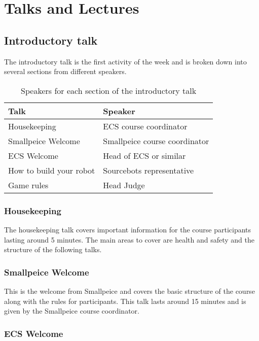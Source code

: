 \section{Talks and Lectures}

\subsection{Introductory talk}

The introductory talk is the first activity of the week and is broken down into several sections from different speakers.

\begin{table}[h]
\begin{tabular}{ll}
 Talk & Speaker \\
 \hline
 Housekeeping & ECS course coordinator \\
 Smallpeice Welcome &  Smallpeice course coordinator \\
 ECS Welcome & Head of ECS or similar \\
 How to build your robot & Sourcebots representative \\
 Game rules & Head Judge \\
\end{tabular}
\caption{Speakers for each section of the introductory talk}
\end{table}

\subsubsection{Housekeeping}

The housekeeping talk covers important information for the course participants lasting around 5 minutes.
The main areas to cover are health and safety and the structure of the following talks.

\subsubsection{Smallpeice Welcome}

This is the welcome from Smallpeice and covers the basic structure of the course along with the rules for participants.
This talk lasts around 15 minutes and is given by the Smallpeice course coordinator.

\subsubsection{ECS Welcome}

